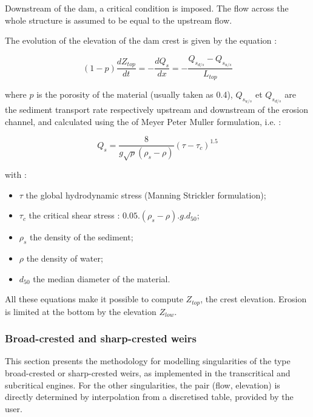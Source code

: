 Downstream of the dam, a critical condition is imposed. The flow across the whole structure is assumed to be equal to the upstream flow.

\vspace{0.5cm}

The evolution of the elevation of the dam crest is given by the equation :

\begin{equation}
 (1-p) \frac{dZ_{top}}{dt} = - \frac{dQ_s}{dx} = - \frac{Q_{s_{d/s}}-Q_{s_{u/s}}}{L_{top}}
\end{equation}

\vspace{0.5cm}

where $p$ is the porosity of the material (usually taken as 0.4), $Q_{s_{u/s}}$ et $Q_{s_{d/s}}$ are the sediment transport rate respectively upstream and downstream of the erosion channel, and calculated using the of Meyer Peter Muller formulation, i.e. :

\begin{equation}
 Q_s = \frac{8}{g \sqrt{\rho}(\rho_s - \rho)}(\tau - \tau_c)^{1.5}
\end{equation}

with :
\begin{itemize}
 \item $\tau$ the global hydrodynamic stress (Manning Strickler formulation);
 \item $\tau_c$ the critical shear stress : $0.05 . (\rho_s - \rho).g.d_{50}$;
 \item $\rho_s$ the density of the sediment;
 \item $\rho$ the density of water;
 \item $d_{50}$ the median diameter of the material.
\end{itemize}

\vspace{0.5cm}

All these equations make it possible to compute $Z_{top}$, the crest elevation. Erosion is limited at the bottom by the elevation $Z_{low}$.

\subsubsection{Broad-crested and sharp-crested weirs}

\label{LoiSeuilMinceEpais}

This section presents the methodology for modelling singularities of the type broad-crested or sharp-crested weirs, as implemented in the transcritical and subcritical engines. For the other singularities, the pair (flow, elevation) is directly determined by interpolation from a discretised table, provided by the user.

